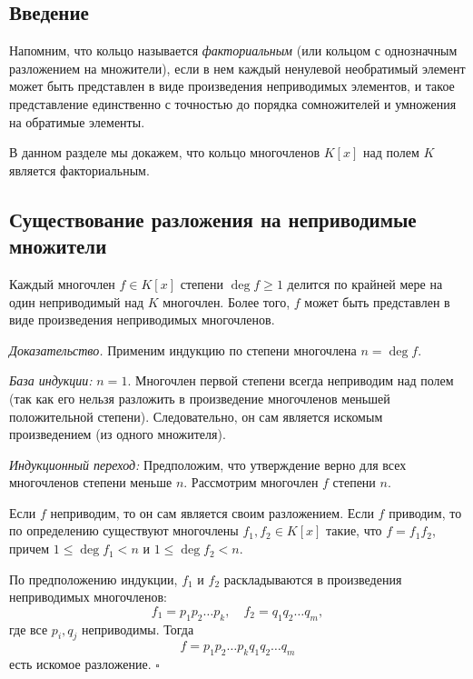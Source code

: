 \documentclass[a4paper,12pt]{article}
\theoremstyle{definition}
\theoremstyle{plain}
\theoremstyle{remark}
\begin{document}
	\subsection{Введение}
	
	Напомним, что кольцо называется \textit{факториальным} (или кольцом с однозначным разложением на множители), если в нем каждый ненулевой необратимый элемент может быть представлен в виде произведения неприводимых элементов, и такое представление единственно с точностью до порядка сомножителей и умножения на обратимые элементы.
	
	В данном разделе мы докажем, что кольцо многочленов \( K[x] \) над полем \( K \) является факториальным.
	
	\subsection{Существование разложения на неприводимые множители}
	
	\begin{tcolorbox}[colback=blue!5, colframe=blue!40!black, title=Предложение 1 (Существование разложения)]
		Каждый многочлен \( f \in K[x] \) степени \( \deg f \geq 1 \) делится по крайней мере на один неприводимый над \( K \) многочлен. Более того, \( f \) может быть представлен в виде произведения неприводимых многочленов.
	\end{tcolorbox}
	
	\medskip
	\textit{Доказательство.}
	Применим индукцию по степени многочлена \( n = \deg f \).
	
	\textit{База индукции:} \( n = 1 \). Многочлен первой степени всегда неприводим над полем (так как его нельзя разложить в произведение многочленов меньшей положительной степени). Следовательно, он сам является искомым произведением (из одного множителя).
	
	\textit{Индукционный переход:} Предположим, что утверждение верно для всех многочленов степени меньше \( n \). Рассмотрим многочлен \( f \) степени \( n \).
	
	Если \( f \) неприводим, то он сам является своим разложением. Если \( f \) приводим, то по определению существуют многочлены \( f_1, f_2 \in K[x] \) такие, что \( f = f_1 f_2 \), причем \( 1 \leq \deg f_1 < n \) и \( 1 \leq \deg f_2 < n \).
	
	По предположению индукции, \( f_1 \) и \( f_2 \) раскладываются в произведения неприводимых многочленов:
	\[
	f_1 = p_1 p_2 \dots p_k, \quad f_2 = q_1 q_2 \dots q_m,
	\]
	где все \( p_i, q_j \) неприводимы. Тогда
	\[
	f = p_1 p_2 \dots p_k q_1 q_2 \dots q_m
	\]
	есть искомое разложение. \hfill \(\square\)
	
\end{document}
